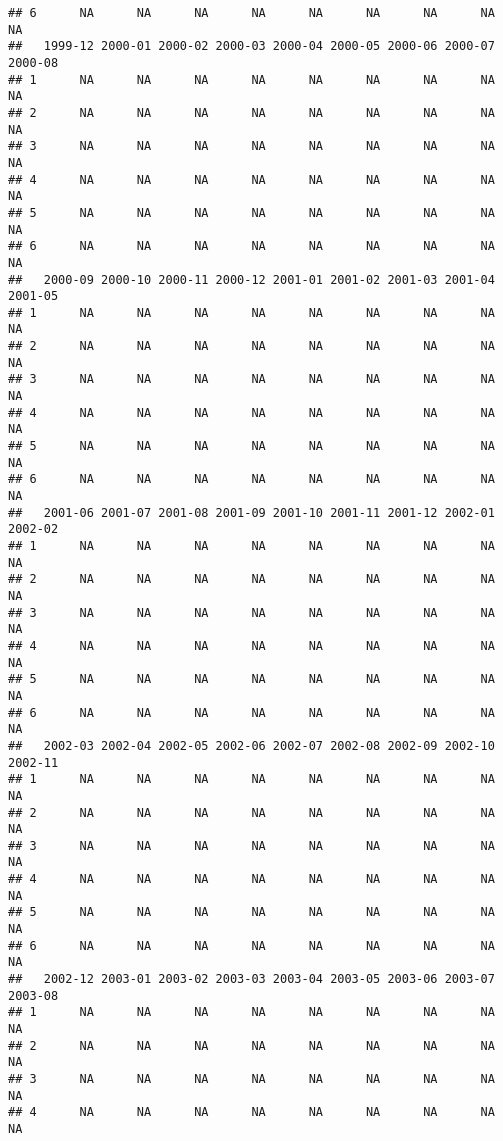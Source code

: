 \documentclass[
]{article}
\begin{document}
\begin{verbatim}
## 6      NA      NA      NA      NA      NA      NA      NA      NA      NA
##   1999-12 2000-01 2000-02 2000-03 2000-04 2000-05 2000-06 2000-07 2000-08
## 1      NA      NA      NA      NA      NA      NA      NA      NA      NA
## 2      NA      NA      NA      NA      NA      NA      NA      NA      NA
## 3      NA      NA      NA      NA      NA      NA      NA      NA      NA
## 4      NA      NA      NA      NA      NA      NA      NA      NA      NA
## 5      NA      NA      NA      NA      NA      NA      NA      NA      NA
## 6      NA      NA      NA      NA      NA      NA      NA      NA      NA
##   2000-09 2000-10 2000-11 2000-12 2001-01 2001-02 2001-03 2001-04 2001-05
## 1      NA      NA      NA      NA      NA      NA      NA      NA      NA
## 2      NA      NA      NA      NA      NA      NA      NA      NA      NA
## 3      NA      NA      NA      NA      NA      NA      NA      NA      NA
## 4      NA      NA      NA      NA      NA      NA      NA      NA      NA
## 5      NA      NA      NA      NA      NA      NA      NA      NA      NA
## 6      NA      NA      NA      NA      NA      NA      NA      NA      NA
##   2001-06 2001-07 2001-08 2001-09 2001-10 2001-11 2001-12 2002-01 2002-02
## 1      NA      NA      NA      NA      NA      NA      NA      NA      NA
## 2      NA      NA      NA      NA      NA      NA      NA      NA      NA
## 3      NA      NA      NA      NA      NA      NA      NA      NA      NA
## 4      NA      NA      NA      NA      NA      NA      NA      NA      NA
## 5      NA      NA      NA      NA      NA      NA      NA      NA      NA
## 6      NA      NA      NA      NA      NA      NA      NA      NA      NA
##   2002-03 2002-04 2002-05 2002-06 2002-07 2002-08 2002-09 2002-10 2002-11
## 1      NA      NA      NA      NA      NA      NA      NA      NA      NA
## 2      NA      NA      NA      NA      NA      NA      NA      NA      NA
## 3      NA      NA      NA      NA      NA      NA      NA      NA      NA
## 4      NA      NA      NA      NA      NA      NA      NA      NA      NA
## 5      NA      NA      NA      NA      NA      NA      NA      NA      NA
## 6      NA      NA      NA      NA      NA      NA      NA      NA      NA
##   2002-12 2003-01 2003-02 2003-03 2003-04 2003-05 2003-06 2003-07 2003-08
## 1      NA      NA      NA      NA      NA      NA      NA      NA      NA
## 2      NA      NA      NA      NA      NA      NA      NA      NA      NA
## 3      NA      NA      NA      NA      NA      NA      NA      NA      NA
## 4      NA      NA      NA      NA      NA      NA      NA      NA      NA

\end{verbatim}
\end{document}
